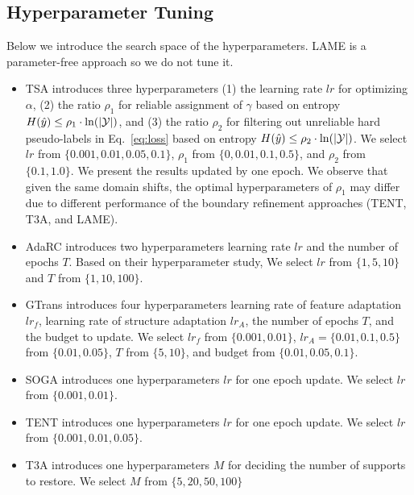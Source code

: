 \subsection{Hyperparameter Tuning}
Below we introduce the search space of the hyperparameters. LAME is a parameter-free approach so we do not tune it.

\begin{itemize}
\item TSA introduces three hyperparameters (1) the learning rate $lr$ for optimizing $\alpha$, (2) the ratio $\rho_1$ for reliable assignment of $\gamma$ based on entropy $H(\hat{y})\leq \rho_1 \cdot \ln ( |{\mathcal{Y}}|)$, and (3) the ratio $\rho_2$ for filtering out unreliable hard pseudo-labels in Eq.~\ref{eq:loss} based on entropy $H(\hat{y})\leq \rho_2 \cdot \ln ( |{\mathcal{Y}}|)$.
We select $lr$ from $\{0.001, 0.01, 0.05, 0.1 \}$, $\rho_1$ from $\{0, 0.01, 0.1, 0.5\}$, and $\rho_2$ from $\{0.1, 1.0\}$.
We present the results updated by one epoch.
We observe that given the same domain shifts, the optimal hyperparameters of $\rho_1$ may differ due to different performance of the boundary refinement approaches (TENT, T3A, and LAME). 

\item AdaRC introduces two hyperparameters learning rate $lr$ and the number of epochs $T$. Based on their hyperparameter study, We select $lr$ from $\{1, 5, 10 \}$ and $T$ from $\{1, 10, 100\}$.

\item GTrans introduces four hyperparameters learning rate of feature adaptation $lr_f$, learning rate of structure adaptation $lr_A$, the number of epochs $T$, and the budget to update. We select $lr_f$ from $\{0.001, 0.01 \}$, $lr_A=\{0.01,0.1,0.5\}$ from $\{0.01, 0.05 \}$, $T$ from $\{5, 10\}$, and budget from $\{0.01, 0.05, 0.1 \}$.

\item SOGA introduces one hyperparameters $lr$ for one epoch update.  We select $lr$ from $\{0.001, 0.01 \}$.

\item TENT introduces one hyperparameters $lr$ for one epoch update.  We select $lr$ from $\{0.001, 0.01, 0.05\}$.

\item T3A introduces one hyperparameters $M$ for deciding the number of supports to restore. We select $M$ from $\{5, 20, 50, 100\}$
\end{itemize}
